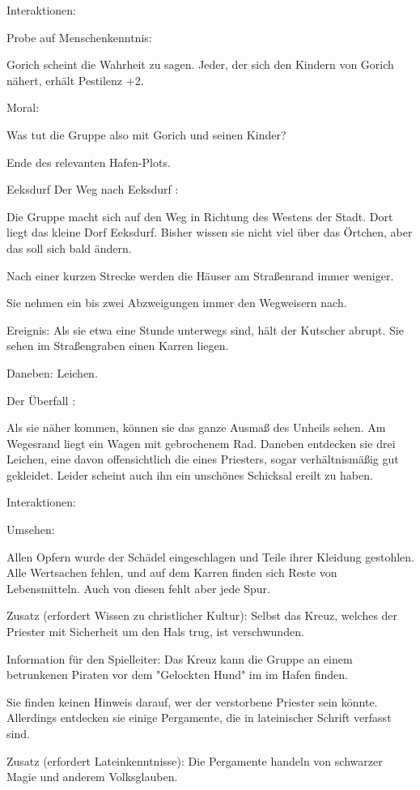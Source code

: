 Interaktionen:

Probe auf Menschenkenntnis:

Gorich scheint die Wahrheit zu sagen.
Jeder, der sich den Kindern von Gorich nähert, erhält Pestilenz +2.

Moral:

Was tut die Gruppe also mit Gorich und seinen Kinder?


Ende des relevanten Hafen-Plots.

Eeksdurf
Der Weg nach Eeksdurf
:

Die Gruppe macht sich auf den Weg in Richtung des Westens der Stadt. Dort liegt das kleine Dorf Eeksdurf. Bisher wissen sie nicht viel über das Örtchen, aber das soll sich bald ändern.

Nach einer kurzen Strecke werden die Häuser am Straßenrand immer weniger.

Sie nehmen ein bis zwei Abzweigungen immer den Wegweisern nach.

Ereignis: Als sie etwa eine Stunde unterwegs sind, hält der Kutscher abrupt. Sie sehen im Straßengraben einen Karren liegen.

Daneben: Leichen.


Der Überfall
:

Als sie näher kommen, können sie das ganze Ausmaß des Unheils sehen. Am Wegesrand liegt ein Wagen mit gebrochenem Rad. Daneben entdecken sie drei Leichen, eine davon offensichtlich die eines Priesters, sogar verhältnismäßig gut gekleidet. Leider scheint auch ihn ein unschönes Schicksal ereilt zu haben.

Interaktionen:

Umsehen:

Allen Opfern wurde der Schädel eingeschlagen und Teile ihrer Kleidung gestohlen.
Alle Wertsachen fehlen, und auf dem Karren finden sich Reste von Lebensmitteln. Auch von diesen fehlt aber jede Spur.

Zusatz (erfordert Wissen zu christlicher Kultur): Selbst das Kreuz, welches der Priester mit Sicherheit um den Hals trug, ist verschwunden.

Information für den Spielleiter: Das Kreuz kann die Gruppe an einem betrunkenen Piraten vor dem "Gelockten Hund" im im Hafen finden.

Sie finden keinen Hinweis darauf, wer der verstorbene Priester sein könnte. Allerdings entdecken sie einige Pergamente, die in lateinischer Schrift verfasst sind.

Zusatz (erfordert Lateinkenntnisse): Die Pergamente handeln von schwarzer Magie und anderem Volksglauben.

